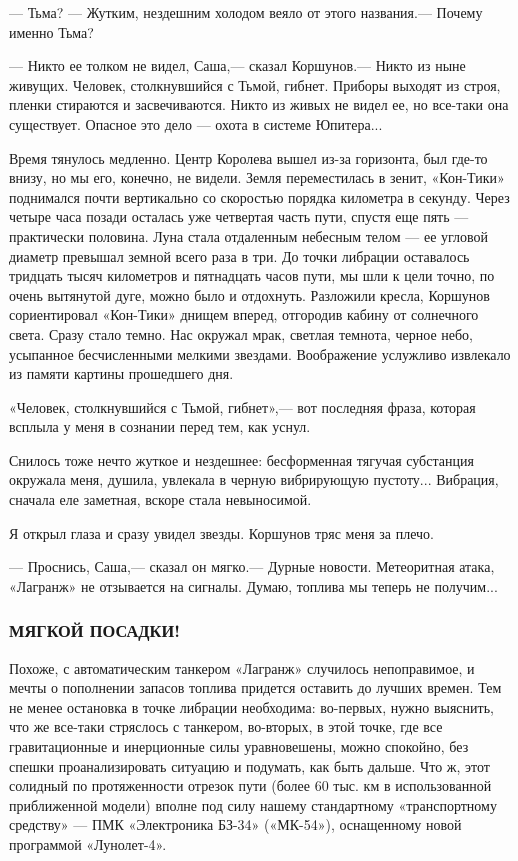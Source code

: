 \documentclass[11pt,a4paper,oneside]{article}
\begin{document}
— Тьма? — Жутким, нездешним холодом веяло от этого названия.— Почему именно Тьма?

— Никто ее толком не видел, Саша,— сказал Коршунов.— Никто из ныне живущих. Человек, столкнувшийся с Тьмой, гибнет. Приборы выходят из строя, пленки стираются и засвечиваются. Никто из живых не видел ее, но все-таки она существует. Опасное это дело — охота в системе Юпитера...

Время тянулось медленно. Центр Королева вышел из-за горизонта, был где-то внизу, но мы его, конечно, не видели. Земля переместилась в зенит, «Кон-Тики» поднимался почти вертикально со скоростью порядка километра в секунду. Через четыре часа позади осталась уже четвертая часть пути, спустя еще пять — практически половина. Луна стала отдаленным небесным телом — ее угловой диаметр превышал земной всего раза в три. До точки либрации оставалось тридцать тысяч километров и пятнадцать часов пути, мы шли к цели точно, по очень вытянутой дуге, можно было и отдохнуть. Разложили кресла, Коршунов сориентировал «Кон-Тики» днищем вперед, отгородив кабину от солнечного света. Сразу стало темно. Нас окружал мрак, светлая темнота, черное небо, усыпанное бесчисленными мелкими звездами. Воображение услужливо извлекало из памяти картины прошедшего дня.

«Человек, столкнувшийся с Тьмой, гибнет»,— вот последняя фраза, которая всплыла у меня в сознании перед тем, как уснул.

Снилось тоже нечто жуткое и нездешнее: бесформенная тягучая субстанция окружала меня, душила, увлекала в черную вибрирующую пустоту... Вибрация, сначала еле заметная, вскоре стала невыносимой.

Я открыл глаза и сразу увидел звезды. Коршунов тряс меня за плечо.

— Проснись, Саша,— сказал он мягко.— Дурные новости. Метеоритная атака, «Лагранж» не отзывается на сигналы. Думаю, топлива мы теперь не получим...

\subsubsection{МЯГКОЙ ПОСАДКИ!}
Похоже, с автоматическим танкером «Лагранж» случилось непоправимое, и мечты о пополнении запасов топлива придется оставить до лучших времен. Тем не менее остановка в точке либрации необходима: во-первых, нужно выяснить, что же все-таки стряслось с танкером, во-вторых, в этой точке, где все гравитационные и инерционные силы уравновешены, можно спокойно, без спешки проанализировать ситуацию и подумать, как быть дальше. Что ж, этот солидный по протяженности отрезок пути (более 60 тыс. км в использованной приближенной модели) вполне под силу нашему стандартному «транспортному средству» — ПМК «Электроника БЗ-34» («МК-54»), оснащенному новой программой «Лунолет-4».
\end{document}
